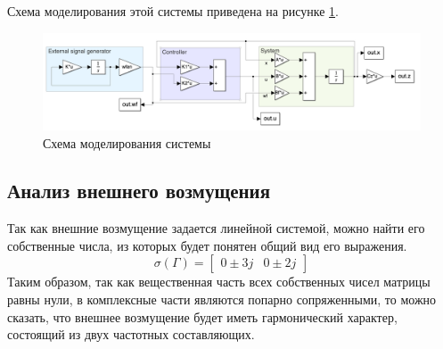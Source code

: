 Схема моделирования этой системы приведена на рисунке \ref{fig:scheme1}.
\begin{figure}[ht!]
    \centering
    \includegraphics[width=\textwidth]{media/scheme1.png}
    \caption{Схема моделирования системы}
    \label{fig:scheme1}
\end{figure}

\subsection{Анализ внешнего возмущения}
Так как внешние возмущение задается линейной системой, можно найти его собственные числа, из которых 
будет понятен общий вид его выражения. 
\begin{equation}
    \sigma(\Gamma) =  \begin{bmatrix}
        0 \pm 3j & 
        0 \pm 2j 
    \end{bmatrix}
\end{equation}
Таким образом, так как вещественная часть всех собственных чисел 
матрицы равны нули, в комплексные части являются попарно сопряженными, 
то можно сказать, что внешнее возмущение будет иметь гармонический характер, 
состоящий из двух частотных составляющих. 

